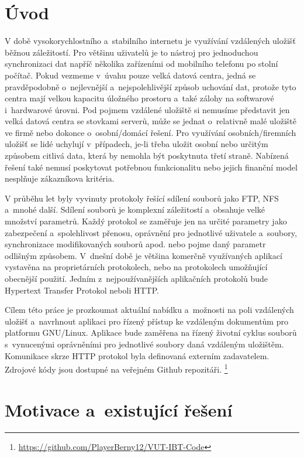 \chapter{Úvod}

V době vysokorychlostního a stabilního internetu je využívání vzdálených uložišť běžnou záležitostí. Pro většinu uživatelů je to nástroj
pro jednoduchou synchronizaci dat napříč několika zařízeními od mobilního telefonu po stolní počítač. Pokud vezmeme v úvahu pouze velká datová centra,
jedná se pravděpodobně o nejlevnější a nejspolehlivější způsob uchování dat, protože tyto centra mají velkou kapacitu úložného prostoru a také zálohy na
softwarové i hardwarové úrovni. Pod pojmem vzdálené uložiště si nemusíme představit jen velká datová centra se stovkami serverů, může se jednat o relativně malé uložiště
ve firmě nebo dokonce o osobní/domácí řešení. Pro využívání osobních/firemních uložišť se lidé uchylují v případech, je-li třeba uložit osobní nebo
určitým způsobem citlivá data, která by nemohla být poskytnuta třetí straně. Nabízená řešení také nemusí poskytovat potřebnou funkcionalitu nebo jejich finanční model
nesplňuje zákazníkova kritéria.

V průběhu let byly vyvinuty protokoly řešící sdílení souborů jako FTP, NFS a mnohé další. Sdílení souborů je komplexní záležitostí a obsahuje
velké množství parametrů. Každý protokol se zaměřuje jen na určité parametry jako zabezpečení a spolehlivost přenosu, oprávnění pro jednotlivé
uživatele a soubory, synchronizace modifikovaných souborů apod. nebo pojme daný parametr odlišným způsobem. V dnešní době je většina komerčně využívaných
aplikací vystavěna na proprietárních protokolech, nebo na protokolech umožňující obecnější použití. Jedním z nejpoužívanějších aplikačních protokolů
bude Hypertext Transfer Protokol neboli HTTP.

Cílem této práce je prozkoumat aktuální nabídku a možnosti na poli vzdálených uložišť a navrhnout aplikaci pro řízený přístup ke vzdáleným dokumentům pro
platformu \mbox{GNU/Linux}. Aplikace bude zaměřena na řízený životní cyklus souborů s vynucenými oprávněními pro jednotlivé soubory daná vzdáleným uložištěm.
Komunikace skrze HTTP protokol byla definovaná externím zadavatelem. Zdrojové kódy jsou dostupné na veřejném Github repozitáři.
\footnote{\url{https://github.com/PlayerBerny12/VUT-IBT-Code}}

\chapter{Motivace a existující řešení}

